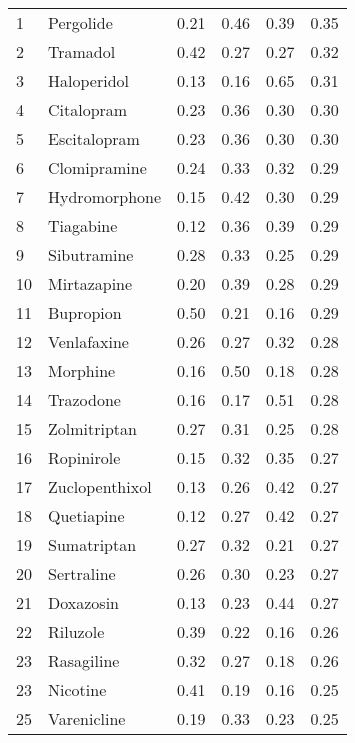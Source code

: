 \documentclass[preprint,11pt]{elsarticle}
\begin{document}
\begin{table}[h]
\begin{tabular}{llllll}
  1 & Pergolide & 0.21 & 0.46 & 0.39 & 0.35 \\ 
  2 & Tramadol & 0.42 & 0.27 & 0.27 & 0.32 \\ 
  3 & Haloperidol & 0.13 & 0.16 & 0.65 & 0.31 \\ 
  4 & Citalopram & 0.23 & 0.36 & 0.30 & 0.30 \\ 
  5 & Escitalopram & 0.23 & 0.36 & 0.30 & 0.30 \\ 
  6 & Clomipramine & 0.24 & 0.33 & 0.32 & 0.29 \\ 
  7 & Hydromorphone & 0.15 & 0.42 & 0.30 & 0.29 \\ 
  8 & Tiagabine & 0.12 & 0.36 & 0.39 & 0.29 \\ 
  9 & Sibutramine & 0.28 & 0.33 & 0.25 & 0.29 \\ 
  10 & Mirtazapine & 0.20 & 0.39 & 0.28 & 0.29 \\ 
  11 & Bupropion & 0.50 & 0.21 & 0.16 & 0.29 \\ 
  12 & Venlafaxine & 0.26 & 0.27 & 0.32 & 0.28 \\ 
  13 & Morphine & 0.16 & 0.50 & 0.18 & 0.28 \\ 
  14 & Trazodone & 0.16 & 0.17 & 0.51 & 0.28 \\ 
  15 & Zolmitriptan & 0.27 & 0.31 & 0.25 & 0.28 \\ 
  16 & Ropinirole & 0.15 & 0.32 & 0.35 & 0.27 \\ 
  17 & Zuclopenthixol & 0.13 & 0.26 & 0.42 & 0.27 \\ 
  18 & Quetiapine & 0.12 & 0.27 & 0.42 & 0.27 \\ 
  19 & Sumatriptan & 0.27 & 0.32 & 0.21 & 0.27 \\ 
  20 & Sertraline & 0.26 & 0.30 & 0.23 & 0.27 \\ 
  21 & Doxazosin & 0.13 & 0.23 & 0.44 & 0.27 \\ 
  22 & Riluzole & 0.39 & 0.22 & 0.16 & 0.26 \\ 
  23 & Rasagiline & 0.32 & 0.27 & 0.18 & 0.26 \\ 
  23 & Nicotine & 0.41 & 0.19 & 0.16 & 0.25 \\ 
  25 & Varenicline & 0.19 & 0.33 & 0.23 & 0.25 \\ 
   \hline
\end{tabular}
\end{table}
\end{document}
